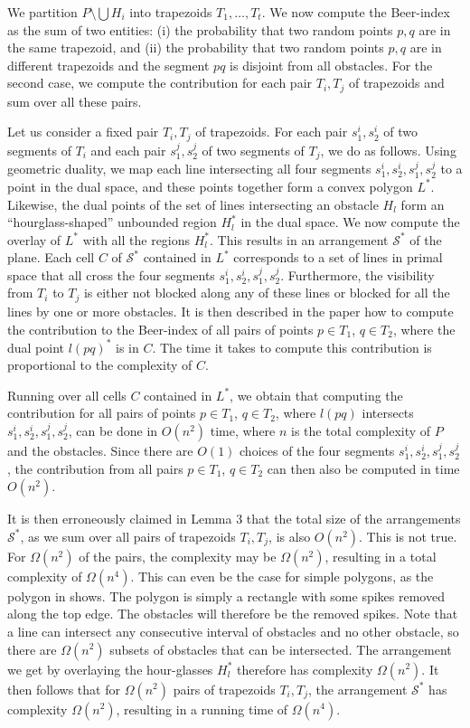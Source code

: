 \documentclass{article}
\begin{document}
We partition $P\setminus \bigcup H_i$ into trapezoids $T_1,\ldots,T_t$.
We now compute the Beer-index as the sum of two entities: (i) the probability that two random points $p,q$ are in the same trapezoid, and (ii) the probability that two random points $p,q$ are in different trapezoids and the segment $pq$ is disjoint from all obstacles.
For the second case, we compute the contribution for each pair $T_i,T_j$ of trapezoids and sum over all these pairs.

Let us consider a fixed pair $T_i,T_j$ of trapezoids.
For each pair $s_1^i,s_2^i$ of two segments of $T_i$ and each pair $s_1^j,s_2^j$ of two segments of $T_j$, we do as follows.
Using geometric duality, we map each line intersecting all four segments $s_1^i,s_2^i,s_1^j,s_2^j$ to a point in the dual space, and these points together form a convex polygon $L^*$.
Likewise, the dual points of the set of lines intersecting an obstacle $H_l$ form an ``hourglass-shaped'' unbounded region $H_l^*$ in the dual space.
We now compute the overlay of $L^*$ with all the regions $H_l^*$.
This results in an arrangement $\mathcal S^*$ of the plane.
Each cell $C$ of $\mathcal S^*$ contained in $L^*$ corresponds to a set of lines in primal space that all cross the four segments $s_1^i,s_2^i,s_1^j,s_2^j$.
Furthermore, the visibility from $T_i$ to $T_j$ is either not blocked along any of these lines or blocked for all the lines by one or more obstacles.
It is then described in the paper how to compute the contribution to the Beer-index of all pairs of points $p\in T_1$, $q\in T_2$, where the dual point $l(pq)^*$ is in $C$.
The time it takes to compute this contribution is proportional to the complexity of $C$.

Running over all cells $C$ contained in $L^*$, we obtain that computing the contribution for all pairs of points $p\in T_1$, $q\in T_2$, where $l(pq)$ intersects $s_1^i,s_2^i,s_1^j,s_2^j$, can be done in $O(n^2)$ time, where $n$ is the total complexity of $P$ and the obstacles.
Since there are $O(1)$ choices of the four segments $s_1^i,s_2^i,s_1^j,s_2^j$, the contribution from all pairs $p\in T_1$, $q\in T_2$ can then also be computed in time $O(n^2)$.

It is then erroneously claimed in Lemma 3 that the total size of the arrangements $\mathcal S^*$, as we sum over all pairs of trapezoids $T_i,T_j$, is also $O(n^2)$.
This is not true.
For $\Omega(n^2)$ of the pairs, the complexity may be $\Omega(n^2)$, resulting in a total complexity of $\Omega(n^4)$.
This can even be the case for simple polygons, as the polygon in  shows.
The polygon is simply a rectangle with some spikes removed along the top edge.
The obstacles will therefore be the removed spikes.
Note that a line can intersect any consecutive interval of obstacles and no other obstacle, so there are $\Omega(n^2)$ subsets of obstacles that can be intersected.
The arrangement we get by overlaying the hour-glasses $H_l^*$ therefore has complexity $\Omega(n^2)$.
It then follows that for $\Omega(n^2)$ pairs of trapezoids $T_i,T_j$, the arrangement $\mathcal S^*$ has complexity $\Omega(n^2)$, resulting in a running time of $\Omega(n^4)$.
\end{document}
